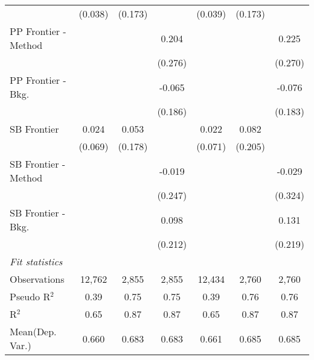 \begin{tabular}{lcccccc}
                        & (0.038)        & (0.173) &         & (0.039)        & (0.173) &   \\   
   PP Frontier - Method &                &         & 0.204   &                &         & 0.225\\   
                        &                &         & (0.276) &                &         & (0.270)\\   
   PP Frontier - Bkg.   &                &         & -0.065  &                &         & -0.076\\   
                        &                &         & (0.186) &                &         & (0.183)\\   
   SB Frontier          & 0.024          & 0.053   &         & 0.022          & 0.082   &   \\   
                        & (0.069)        & (0.178) &         & (0.071)        & (0.205) &   \\   
   SB Frontier - Method &                &         & -0.019  &                &         & -0.029\\   
                        &                &         & (0.247) &                &         & (0.324)\\   
   SB Frontier - Bkg.   &                &         & 0.098   &                &         & 0.131\\   
                        &                &         & (0.212) &                &         & (0.219)\\   
   \midrule
   \emph{Fit statistics}\\
   Observations         & 12,762         & 2,855   & 2,855   & 12,434         & 2,760   & 2,760\\  
   Pseudo R$^2$         & 0.39           & 0.75    & 0.75    & 0.39           & 0.76    & 0.76\\  
   R$^2$                & 0.65           & 0.87    & 0.87    & 0.65           & 0.87    & 0.87\\  
Mean(Dep. Var.) & 0.660 & 0.683 & 0.683 & 0.661 & 0.685 & 0.685 \\
   

\end{tabular}
